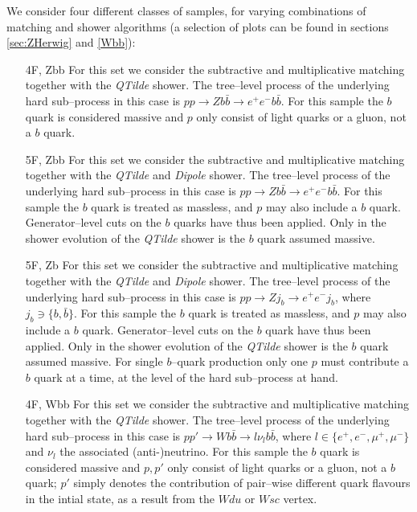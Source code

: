 \documentclass[11pt]{cernrep}
\begin{document}
We consider four different classes of samples, for varying combinations of
matching and shower algorithms (a selection of plots can be found in sections
\ref{sec:ZHerwig} and \ref{Wbb}):
\begin{itemize}
\item[4F, Zbb] For this set we consider the subtractive and multiplicative
  matching together with the \textit{QTilde} shower. The tree--level process of
  the underlying hard sub--process in this case is
  $pp \to Z b\bar{b} \to e^+ e^- b\bar{b}$. For this sample the $b$ quark is
  considered massive and $p$ only consist of light quarks or a gluon, not a $b$
  quark.
\item[5F, Zbb] For this set we consider the subtractive and multiplicative
  matching together with the \textit{QTilde} and \textit{Dipole} shower. The
  tree--level process of the underlying hard sub--process in this case is
  $pp \to Z b\bar{b} \to e^+ e^- b\bar{b}$. For this sample the $b$ quark is
  treated as massless, and $p$ may also include a $b$ quark. Generator--level
  cuts on the $b$ quarks have thus been applied. Only in the shower evolution of
  the \textit{QTilde} shower is the $b$ quark assumed massive.
\item[5F, Zb] For this set we consider the subtractive and multiplicative
  matching together with the \textit{QTilde} and \textit{Dipole} shower. The
  tree--level process of the underlying hard sub--process in this case is
  $pp \to Z j_b \to e^+ e^- j_b$, where $j_b\ni\{b,\bar{b}\}$. For this sample
  the $b$ quark is treated as massless, and $p$ may also include a $b$ quark.
  Generator--level cuts on the $b$ quark have thus been applied. Only in the
  shower evolution of the \textit{QTilde} shower is the $b$ quark assumed
  massive. For single $b$--quark production only one $p$ must contribute a $b$
  quark at a time, at the level of the hard sub--process at hand.
\item[4F, Wbb] For this set we consider the subtractive and multiplicative
  matching together with the \textit{QTilde} shower. The tree--level process of
  the underlying hard sub--process in this case is
  $pp' \to W b\bar{b} \to l \nu_l b\bar{b}$, where
  $l \in \{e^+, e^-, \mu^+, \mu^-\}$ and $\nu_l$ the associated (anti-)neutrino.
  For this sample the $b$ quark is considered massive and $p,p'$ only consist of
  light quarks or a gluon, not a $b$ quark; $p'$ simply denotes the contribution
  of pair--wise different quark flavours in the intial state, as a result from
  the $Wdu$ or $Wsc$ vertex.
\end{itemize}
\end{document}
